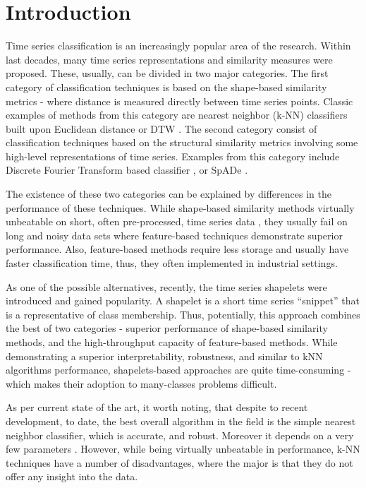 \documentclass{llncs}
\begin{document}
\section{Introduction}
%
Time series classification is an increasingly popular area of the research. Within last decades,
many time series representations and similarity measures were proposed. These, usually, can be
divided in two major categories. The first category of classification techniques is based on
the shape-based similarity metrics - where distance is measured directly between time series
points. Classic examples of methods from this category are nearest neighbor (k-NN) classifiers
built upon Euclidean distance or DTW \cite{1NN}. The second category consist of classification
techniques based on the structural similarity metrics involving some high-level representations
of time series. Examples from this category include Discrete Fourier Transform based classifier
\cite{DFT}, or SpADe \cite{spade}. 

The existence of these two categories can be explained by differences in the performance of these
techniques. While shape-based similarity methods virtually unbeatable on short, often pre-processed,
time series data \cite{benchmark}, they usually fail on long and noisy data sets \cite{indexing}
where feature-based techniques demonstrate superior performance. Also, feature-based methods
require less storage and usually have faster classification time, thus, they often implemented in
industrial settings. 

As one of the possible alternatives, recently, the time series shapelets were introduced 
\cite{shapelet} and gained popularity. A shapelet is a short time series ``snippet'' that is a 
representative of class membership. Thus, potentially, this approach combines the best of two
categories - superior performance of shape-based similarity methods, and the high-throughput 
capacity of feature-based methods\cite{logical}. While demonstrating a superior interpretability, 
robustness, and similar to kNN algorithms performance, shapelets-based approaches are quite 
time-consuming - which makes their adoption to many-classes problems difficult. 

As per current state of the art, it worth noting, that despite to recent development, to date, the
best overall algorithm in the field is the simple nearest neighbor classifier, which is accurate,
and robust. Moreover it depends on a very few parameters \cite{comparison}
\cite{classifiers} \cite{benchmark}. However, while being virtually unbeatable in performance,
k-NN techniques have a number of disadvantages, where the major is that they do not offer any 
insight into the data.
\end{document}
